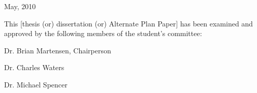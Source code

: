 \thispagestyle{empty}

\begin{flushright}
May, 2010
\end{flushright}

\noindent This [thesis (or) dissertation (or) Alternate Plan Paper] has been examined and approved  by the following members of the student's committee: \\

  

\hspace{3in}\underline{\hspace{2.5in}}

\hspace{3in}Dr. Brian Martensen, Chairperson

\vspace{0.5in}
\hspace{3in}\underline{\hspace{2.5in}}

\hspace{3in}Dr. Charles Waters

\vspace{0.5in}
\hspace{3in}\underline{\hspace{2.5in}}

\hspace{3in}Dr. Michael Spencer

